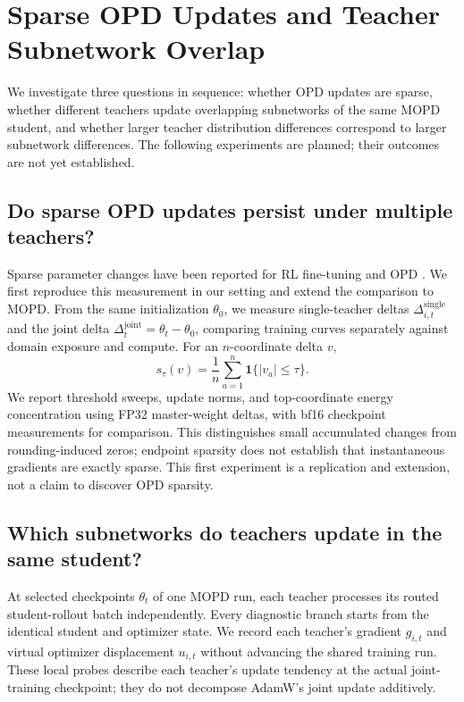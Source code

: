 \section{Sparse OPD Updates and Teacher Subnetwork Overlap}
\label{sec:subnetworks}

We investigate three questions in sequence: whether OPD updates are sparse,
whether different teachers update overlapping subnetworks of the same MOPD
student, and whether larger teacher distribution differences correspond to
larger subnetwork differences. The following experiments are planned;
their outcomes are not yet established.

\subsection{Do sparse OPD updates persist under multiple teachers?}

Sparse parameter changes have been reported for RL fine-tuning
\citep{mukherjee2025subnetworks} and OPD
\citep{yu2026denseupdates,shen2026opdgeometry}. We first reproduce this
measurement in our setting and extend the comparison to MOPD. From the
same initialization $\theta_0$, we measure single-teacher deltas
$\Delta_{i,t}^{\mathrm{single}}$ and the joint delta
$\Delta_t^{\mathrm{joint}}=\theta_t-\theta_0$, comparing training curves
separately against domain exposure and compute. For an $n$-coordinate delta $v$,
\begin{equation}
 s_\tau(v)=\frac1n\sum_{a=1}^n
       \mathbf 1\{|v_a|\leq\tau\}.
 \label{subnet_sparsity}
\end{equation}
We report threshold sweeps, update norms, and top-coordinate energy
concentration using FP32 master-weight deltas, with bf16 checkpoint
measurements for comparison. This distinguishes small accumulated changes
from rounding-induced zeros; endpoint sparsity does not establish that
instantaneous gradients are exactly sparse. This first experiment is a
replication and extension, not a claim to discover OPD sparsity.

\subsection{Which subnetworks do teachers update in the same student?}

At selected checkpoints $\theta_t$ of one MOPD run, each teacher processes
its routed student-rollout batch independently. Every diagnostic branch
starts from the identical student and optimizer state. We record each
teacher's gradient $g_{i,t}$ and virtual optimizer displacement $u_{i,t}$
without advancing the shared training run. These local probes describe
each teacher's update tendency at the actual joint-training checkpoint;
they do not decompose AdamW's joint update additively.


